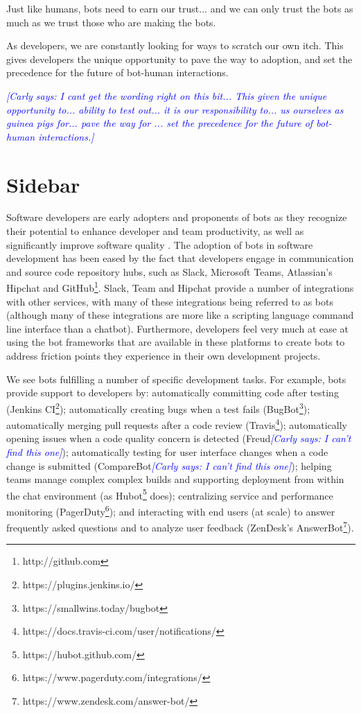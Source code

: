\documentclass{sig-alternate}
\newcommand{\cl}[1]{\textcolor{blue}{{\it [Carly says: #1]}}}
\begin{document}
	Just like humans, bots need to earn our trust... and we can only trust the bots as much as we trust those who are making the bots. 

	As developers, we are constantly looking for ways to scratch our own itch.  This gives developers the unique opportunity to pave the way to adoption, and set the precedence for the future of bot-human interactions. 


	\cl{I cant get the wording right on this bit...  This given the unique opportunity to... ability to test out... it is our responsibility to... us ourselves as guinea pigs for... pave the way for ... set the precedence for the future of bot-human interactions.}



\section*{Sidebar}

Software developers are early adopters and proponents of bots as they recognize their potential to enhance developer and team productivity, as well as significantly improve software quality \cite{storey2016disrupting}. 
The adoption of bots in software development has been eased by the fact that developers engage in communication and source code repository hubs, such as Slack, Microsoft Teams, Atlassian's Hipchat and GitHub\footnote{http://github.com}.  Slack, Team and Hipchat provide a number of integrations with other services, with many of these integrations being referred to as bots (although many of these integrations are more like a scripting language command line interface than a chatbot). 
Furthermore, developers feel very much at ease at using the bot frameworks that are available in these platforms to create bots to address friction points they experience in their own development projects. 
 
We see bots fulfilling a number of specific development tasks. For example, bots provide support to developers by:
automatically committing code after testing (Jenkins CI\footnote{https://plugins.jenkins.io/}); 
automatically creating bugs when a test fails (BugBot\footnote{https://smallwins.today/bugbot}); 
automatically merging pull requests after a code review (Travis\footnote{https://docs.travis-ci.com/user/notifications/}); 
automatically opening issues when a code quality concern is detected (Freud\cl{I can't find this one});
automatically testing for user interface changes when a code change is submitted (CompareBot\cl{I can't find this one}); 
helping teams manage complex complex builds and supporting deployment from within the chat environment (as Hubot\footnote{https://hubot.github.com/} does); 
centralizing service and performance monitoring (PagerDuty\footnote{https://www.pagerduty.com/integrations/}); 
and interacting with end users (at scale) to answer frequently asked questions and to analyze user feedback (ZenDesk's AnswerBot\footnote{https://www.zendesk.com/answer-bot/}).
\end{document}
